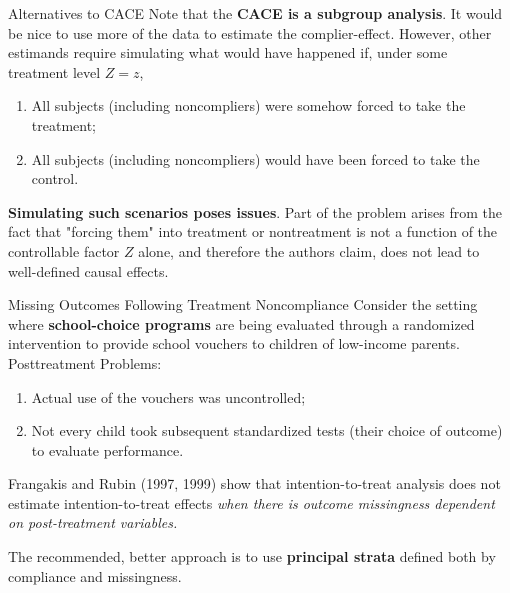 \documentclass[10pt]{beamer}
\begin{document}
\begin{frame}{Alternatives to CACE}
Note that the \textbf{CACE is a subgroup analysis}. It would be 
nice to use more of the data to estimate the complier-effect. 
However, other estimands require simulating what would have happened 
if, under some treatment level $Z=z$, 
\begin{enumerate}
    \item All subjects (including noncompliers) were somehow forced to take the 
    treatment; 
    \item All subjects (including noncompliers) would have been forced to take the control.
\end{enumerate}

\textbf{Simulating such scenarios poses issues}. Part of the problem 
arises from the fact that "forcing them" into treatment or nontreatment
is not a function of the controllable factor $Z$ alone, and therefore
the authors claim, does not lead to well-defined causal effects. 
\end{frame}

\begin{frame}{Missing Outcomes Following Treatment Noncompliance}
Consider the setting where \textbf{school-choice programs} are being evaluated through a
randomized intervention to provide school vouchers to children of low-income
parents. Posttreatment Problems:
\begin{enumerate}
    \item Actual use of the vouchers was uncontrolled; 
    \item Not every child took subsequent standardized tests (their choice of outcome) 
    to evaluate performance. 
\end{enumerate}

Frangakis and Rubin (1997, 1999) show that intention-to-treat analysis 
does not estimate intention-to-treat effects \textit{when there is 
outcome missingness dependent on post-treatment variables.}

The recommended, better approach is to use \textbf{principal strata} defined both by compliance and missingness. 
\end{frame}
\end{document}
